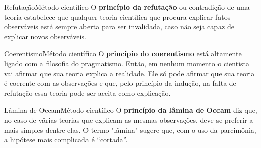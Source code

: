 \documentclass[t]{beamer}
\begin{document}

\begin{ftst}{Refutação}{Método científico}
\vone
\justifying
O \textbf{princípio da refutação} ou contradição de uma teoria estabelece que qualquer teoria científica que procura explicar fatos observáveis está sempre aberta para ser invalidada, caso não seja capaz de explicar novos observáveis.
\vone



\end{ftst}


\begin{ftst}{Coerentismo}{Método científico}
\vone
\justifying
O \textbf{princípio do coerentismo} está altamente ligado com a filosofia do pragmatismo. 
\vone
Então, em nenhum momento o cientista vai afirmar que sua teoria explica a realidade. Ele só pode afirmar que sua teoria é coerente com as observações e que, pelo princípio da indução, na falta de refutação essa teoria pode ser aceita como explicação.

\end{ftst}


\begin{ftst}{Lâmina de Occam}{Método científico}
\vone
\justifying
O \textbf{princípio da lâmina de Occam} diz que, no caso de várias teorias que explicam as mesmas observações, deve-se preferir a mais simples dentre elas.
\vone
O termo "lâmina" sugere que, com o uso da parcimônia, a hipótese mais complicada é “cortada”. 

\end{ftst}

\end{document}

